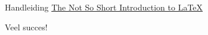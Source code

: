 \documentclass{beamer}
\begin{document}
\begin{frame}{Handleiding}
\href{http://homepages.vub.ac.be/~andooms/lshort.pdf}{The Not So
Short Introduction to \LaTeX}
\end{frame}


\begin{frame}
\transdissolve
\begin{alertblock}{}
\begin{center}
Veel succes!
\end{center}
\end{alertblock}
\end{frame}
\end{document}
